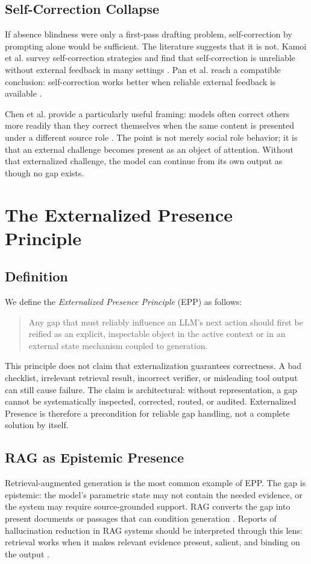\documentclass[10pt,conference]{IEEEtran}
\begin{document}
\subsection{Self-Correction Collapse}
If absence blindness were only a first-pass drafting problem, self-correction by prompting alone would be sufficient. The literature suggests that it is not. Kamoi et al. survey self-correction strategies and find that self-correction is unreliable without external feedback in many settings \cite{kamoi2024selfcorrection}. Pan et al. reach a compatible conclusion: self-correction works better when reliable external feedback is available \cite{pan2023automatically}.

Chen et al. provide a particularly useful framing: models often correct others more readily than they correct themselves when the same content is presented under a different source role \cite{chen2026selfcorrection}. The point is not merely social role behavior; it is that an external challenge becomes present as an object of attention. Without that externalized challenge, the model can continue from its own output as though no gap exists.

\section{The Externalized Presence Principle}
\subsection{Definition}
We define the \emph{Externalized Presence Principle} (EPP) as follows:
\begin{quote}
Any gap that must reliably influence an LLM's next action should first be reified as an explicit, inspectable object in the active context or in an external state mechanism coupled to generation.
\end{quote}
This principle does not claim that externalization guarantees correctness. A bad checklist, irrelevant retrieval result, incorrect verifier, or misleading tool output can still cause failure. The claim is architectural: without representation, a gap cannot be systematically inspected, corrected, routed, or audited. Externalized Presence is therefore a precondition for reliable gap handling, not a complete solution by itself.

\subsection{RAG as Epistemic Presence}
Retrieval-augmented generation is the most common example of EPP. The gap is epistemic: the model's parametric state may not contain the needed evidence, or the system may require source-grounded support. RAG converts the gap into present documents or passages that can condition generation \cite{lewis2020rag}. Reports of hallucination reduction in RAG systems should be interpreted through this lens: retrieval works when it makes relevant evidence present, salient, and binding on the output \cite{zhang2025rag,wood2025ragtruth}.
\end{document}
